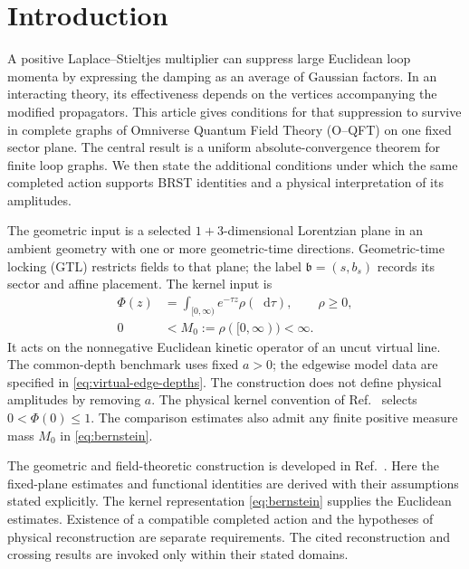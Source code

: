 \documentclass[final,5p,times,twocolumn,numbers,nopreprintline]{elsarticle}
\numberwithin{equation}{section}
\theoremstyle{definition}
\theoremstyle{remark}
\newcommand{\dd}{\mathop{}\!\mathrm d}
\newcommand{\bb}{\mathfrak b}
\newcommand{\Ph}{\Phi}
\newcommand{\Mzero}{M_0}
\begin{document}
\section{Introduction}
\label{sec:introduction}

A positive Laplace--Stieltjes multiplier can suppress large Euclidean
loop momenta by expressing the damping as an average of Gaussian
factors. In an interacting theory, its effectiveness depends on the
vertices accompanying the modified propagators. This article gives
conditions for that suppression to survive in complete graphs of
Omniverse Quantum Field Theory (O--QFT) on one fixed sector plane.
The central result is a uniform absolute-convergence theorem for
finite loop graphs. We then state the additional conditions under
which the same completed action supports BRST identities and a
physical interpretation of its amplitudes.

The geometric input is a selected \(1+3\)-dimensional Lorentzian plane
in an ambient geometry with one or more geometric-time directions.
Geometric-time locking (GTL) restricts fields to that plane; the label
\(\bb=(s,b_s)\) records its sector and affine placement.
The kernel input is
\begin{equation}
\begin{aligned}
 \Ph(z)&=\int_{[0,\infty)}e^{-\tau z}\rho(\dd\tau),\qquad \rho\geq0,\\
 0&<\Mzero:=\rho([0,\infty))<\infty .
\end{aligned}
 \label{eq:bernstein}
\end{equation}
It acts on the nonnegative Euclidean kinetic operator of an uncut
virtual line. The common-depth benchmark uses fixed \(a>0\); the edgewise
model data are specified in \eqref{eq:virtual-edge-depths}. The
construction does not define physical amplitudes by removing \(a\).
The physical kernel convention of Ref.~\cite{ChiapponeMonograph}
selects \(0<\Ph(0)\leq1\). The comparison estimates also admit
any finite positive measure mass \(M_0\) in \eqref{eq:bernstein}.

The geometric and field-theoretic construction is developed in
Ref.~\cite{ChiapponeMonograph}. Here the fixed-plane estimates and
functional identities are derived with their assumptions stated
explicitly. The kernel representation \eqref{eq:bernstein} supplies
the Euclidean estimates. Existence of a compatible completed action
and the hypotheses of physical reconstruction are separate requirements.
The cited reconstruction and crossing results are invoked only within
their stated domains.
\end{document}

